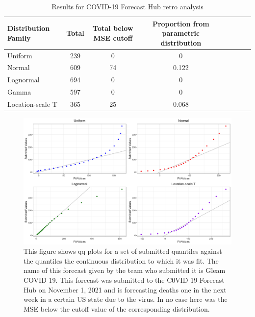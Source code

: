 \documentclass[11pt,notitlepage]{isuthesis}
\begin{document}
\begin{table}[h!]
  \centering
  \begin{tabular}{l*{6}{c}r}
  Distribution Family   & Total    & Total below MSE cutoff 
  & Proportion from parametric distribution\\
  \hline
  Uniform               & 239      & 0    & 0    \\
  Normal                & 609      & 74   & 0.122    \\
  Lognormal             & 694      & 0    & 0    \\
  Gamma                 & 597      & 0    & 0    \\
  Location-scale T      & 365      & 25   & 0.068    \\
  \end{tabular}
  \begin{center}
\begin{minipage}{10cm}
\captionsetup{font=scriptsize}
  \caption[COVID-19 Forecast Hub results]{Results for COVID-19 Forecast Hub
  retro analysis}
  \label{table:cresults}
  \end{minipage}
  \end{center}
\end{table}


\begin{figure}[htbp]
\centerline{\includegraphics[scale=.15]{Images/qq_gleam_110121_1wkincdeath_st16.png}}
\begin{center}
\begin{minipage}{10cm}
\captionsetup{font=scriptsize}
\caption[QQ plot for quantile fit]{This figure shows qq plots for a set of
submitted quantiles against the quantiles the continuous distribution to which
it was fit. 
The name of this forecast given by the team who submitted it is Gleam COVID-19.
This forecast was submitted to the C0VID-19 Forecast Hub on November 1, 2021
and is forecasting deaths one in the next week in a certain US state due to the
virus.
In no case here was the MSE below the cutoff value of the 
corresponding distribution.}
\label{fig:qqfits}
\end{minipage}
\end{center}
\end{figure}
\end{document}
